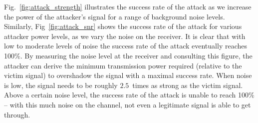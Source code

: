 Fig.~\ref{fig:attack_strength} illustrates the success rate of the attack as we increase the power of the attacker's signal for a range of background noise levels.
Similarly, Fig~\ref{fig:attack_snr} shows the success rate of the attack for various attacker power levels, as we vary the noise on the receiver.
It is clear that with low to moderate levels of noise the success rate of the attack eventually reaches 100\%.
By measuring the noise level at the receiver and consulting this figure, the attacker can derive the minimum transmission power required (relative to the victim signal) to overshadow the signal with a maximal success rate.
When noise is low, the signal needs to be roughly $2.5$~times as strong as the victim signal.
Above a certain noise level, the success rate of the attack is unable to reach 100\% -- with this much noise on the channel, not even a legitimate signal is able to get through.
